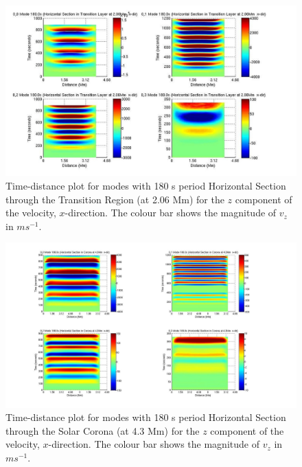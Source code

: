 \documentclass[preprint,authoryear,12pt]{elsarticle}
\begin{document}
\begin{figure}[h]
\includegraphics[scale=1]{imrescale/dt_180_horiz_x_2p06Mm.jpg}
\caption{Time-distance plot for modes with 180 s period Horizontal Section through the Transition Region (at 2.06 Mm) for the $z$  component of the velocity, $x$-direction. The colour bar shows the magnitude of $v_z$ in $ms^{-1}$.}
\label{Fig15}
\end{figure}

\begin{figure}[h]
\includegraphics[scale=1]{imrescale/dt_180_horiz_x_4p3Mm.jpg}
\caption{Time-distance plot for modes with 180 s period Horizontal Section through the Solar Corona (at 4.3 Mm) for the $z$ component of the velocity, $x$-direction. The colour bar shows the magnitude of $v_z$ in $ms^{-1}$.}
\label{Fig16}
\end{figure}
\end{document}
